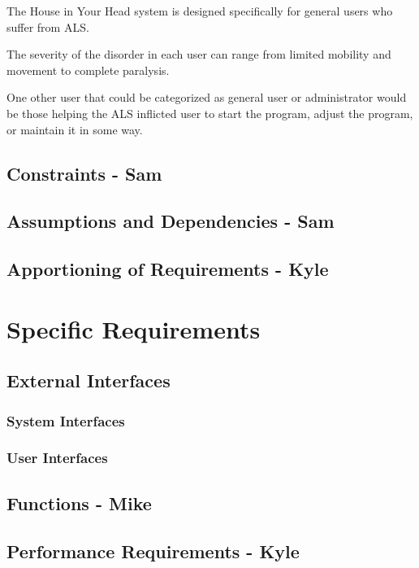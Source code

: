 \documentclass{report}
\begin{document}
The House in Your Head system is designed specifically for general users who suffer from ALS. 

The severity of the disorder in each user can range from limited mobility and movement to complete 
paralysis. 

One other user that could be categorized as general user or administrator would be those helping the 
ALS inflicted user to start the program, adjust the program, or maintain it in some way.

\subsection{Constraints - Sam}

\subsection{Assumptions and Dependencies - Sam}

\subsection{Apportioning of Requirements - Kyle}

\newpage

\section{Specific Requirements}

\subsection{External Interfaces}

\subsubsection{System Interfaces}

\subsubsection{User Interfaces}

\subsection{Functions - Mike}

\subsection{Performance Requirements - Kyle}
\end{document}
